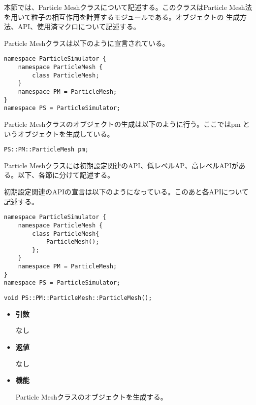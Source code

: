 本節では、Particle Meshクラスについて記述する。このクラスはParticle
Mesh法を用いて粒子の相互作用を計算するモジュールである。オブジェクトの
生成方法、API、使用済マクロについて記述する。


Particle Meshクラスは以下のように宣言されている。
\begin{lstlisting}[caption=ParticleMesh0]
namespace ParticleSimulator {
    namespace ParticleMesh {
        class ParticleMesh;
    }
    namespace PM = ParticleMesh;
}
namespace PS = ParticleSimulator;
\end{lstlisting}

Particle Meshクラスのオブジェクトの生成は以下のように行う。ここではpm
というオブジェクトを生成している。
\begin{screen}
\begin{verbatim}
PS::PM::ParticleMesh pm;
\end{verbatim}
\end{screen}


Particle Meshクラスには初期設定関連のAPI、低レベルAP、高レベルAPIがあ
る。以下、各節に分けて記述する。


初期設定関連のAPIの宣言は以下のようになっている。このあと各APIについて
記述する。
\begin{lstlisting}[caption=ParticleMesh1]
namespace ParticleSimulator {
    namespace ParticleMesh {
        class ParticleMesh{
            ParticleMesh();
        };
    }
    namespace PM = ParticleMesh;
}
namespace PS = ParticleSimulator;
\end{lstlisting}


\begin{screen}
\begin{verbatim}
void PS::PM::ParticleMesh::ParticleMesh();
\end{verbatim}
\end{screen}

\begin{itemize}

\item {\bf 引数}

なし

\item {\bf 返値}

なし

\item {\bf 機能}

Particle Meshクラスのオブジェクトを生成する。

\end{itemize}

